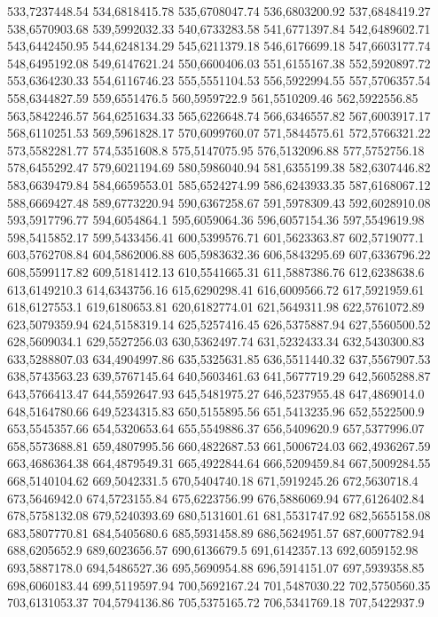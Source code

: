 533,7237448.54
534,6818415.78
535,6708047.74
536,6803200.92
537,6848419.27
538,6570903.68
539,5992032.33
540,6733283.58
541,6771397.84
542,6489602.71
543,6442450.95
544,6248134.29
545,6211379.18
546,6176699.18
547,6603177.74
548,6495192.08
549,6147621.24
550,6600406.03
551,6155167.38
552,5920897.72
553,6364230.33
554,6116746.23
555,5551104.53
556,5922994.55
557,5706357.54
558,6344827.59
559,6551476.5
560,5959722.9
561,5510209.46
562,5922556.85
563,5842246.57
564,6251634.33
565,6226648.74
566,6346557.82
567,6003917.17
568,6110251.53
569,5961828.17
570,6099760.07
571,5844575.61
572,5766321.22
573,5582281.77
574,5351608.8
575,5147075.95
576,5132096.88
577,5752756.18
578,6455292.47
579,6021194.69
580,5986040.94
581,6355199.38
582,6307446.82
583,6639479.84
584,6659553.01
585,6524274.99
586,6243933.35
587,6168067.12
588,6669427.48
589,6773220.94
590,6367258.67
591,5978309.43
592,6028910.08
593,5917796.77
594,6054864.1
595,6059064.36
596,6057154.36
597,5549619.98
598,5415852.17
599,5433456.41
600,5399576.71
601,5623363.87
602,5719077.1
603,5762708.84
604,5862006.88
605,5983632.36
606,5843295.69
607,6336796.22
608,5599117.82
609,5181412.13
610,5541665.31
611,5887386.76
612,6238638.6
613,6149210.3
614,6343756.16
615,6290298.41
616,6009566.72
617,5921959.61
618,6127553.1
619,6180653.81
620,6182774.01
621,5649311.98
622,5761072.89
623,5079359.94
624,5158319.14
625,5257416.45
626,5375887.94
627,5560500.52
628,5609034.1
629,5527256.03
630,5362497.74
631,5232433.34
632,5430300.83
633,5288807.03
634,4904997.86
635,5325631.85
636,5511440.32
637,5567907.53
638,5743563.23
639,5767145.64
640,5603461.63
641,5677719.29
642,5605288.87
643,5766413.47
644,5592647.93
645,5481975.27
646,5237955.48
647,4869014.0
648,5164780.66
649,5234315.83
650,5155895.56
651,5413235.96
652,5522500.9
653,5545357.66
654,5320653.64
655,5549886.37
656,5409620.9
657,5377996.07
658,5573688.81
659,4807995.56
660,4822687.53
661,5006724.03
662,4936267.59
663,4686364.38
664,4879549.31
665,4922844.64
666,5209459.84
667,5009284.55
668,5140104.62
669,5042331.5
670,5404740.18
671,5919245.26
672,5630718.4
673,5646942.0
674,5723155.84
675,6223756.99
676,5886069.94
677,6126402.84
678,5758132.08
679,5240393.69
680,5131601.61
681,5531747.92
682,5655158.08
683,5807770.81
684,5405680.6
685,5931458.89
686,5624951.57
687,6007782.94
688,6205652.9
689,6023656.57
690,6136679.5
691,6142357.13
692,6059152.98
693,5887178.0
694,5486527.36
695,5690954.88
696,5914151.07
697,5939358.85
698,6060183.44
699,5119597.94
700,5692167.24
701,5487030.22
702,5750560.35
703,6131053.37
704,5794136.86
705,5375165.72
706,5341769.18
707,5422937.9
